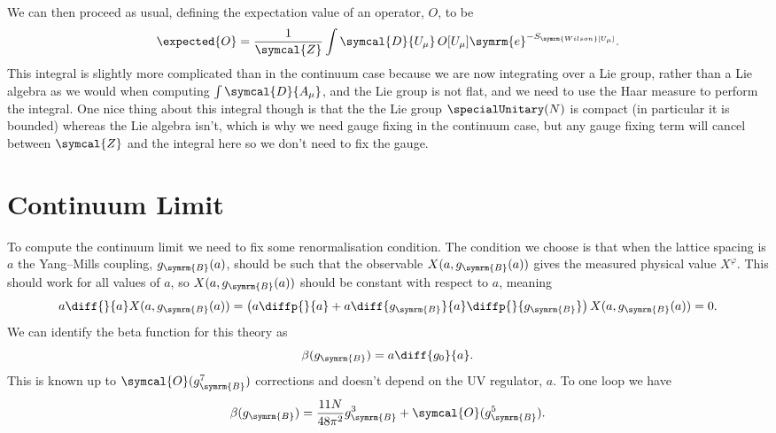 \documentclass[fleqn]{NotesClass}
\newcommand{\e}{\symrm{e}}
\newcommand{\DL}[1]{\symcal{D}{#1}}
\newcommand{\bare}{\symrm{B}}
\newcommand{\order}{\symcal{O}}
\newcommand{\partitionFunction}{\symcal{Z}}
\begin{document}
    We can then proceed as usual, defining the expectation value of an operator, \(O\), to be
    \begin{equation}
        \expected{O} = \frac{1}{\partitionFunction} \int \DL{U_\mu} \, O[U_\mu] \e^{-S_{\symrm{Wilson}[U_\mu]}}.
    \end{equation}
    This integral is slightly more complicated than in the continuum case because we are now integrating over a Lie group, rather than a Lie algebra as we would when computing \(\int\DL{A_\mu}\), and the Lie group is not flat, and we need to use the Haar measure to perform the integral.
    One nice thing about this integral though is that the the Lie group \(\specialUnitary(N)\) is compact (in particular it is bounded) whereas the Lie algebra isn't, which is why we need gauge fixing in the continuum case, but any gauge fixing term will cancel between \(\partitionFunction\) and the integral here so we don't need to fix the gauge.
    
    \section{Continuum Limit}
    To compute the continuum limit we need to fix some renormalisation condition.
    The condition we choose is that when the lattice spacing is \(a\) the Yang--Mills coupling, \(g_\bare(a)\), should be such that the observable \(X(a, g_\bare(a))\) gives the measured physical value \(X^\varphi\).
    This should work for all values of \(a\), so \(X(a, g_\bare(a))\) should be constant with respect to \(a\), meaning
    \begin{equation}
        a\diff{}{a}X(a, g_\bare(a)) = \left( a \diffp{}{a} + a\diff{g_{\bare}}{a}\diffp{}{g_\bare} \right) X(a, g_\bare(a)) = 0.
    \end{equation}
    We can identify the beta function for this theory as
    \begin{equation}
        \beta(g_\bare) = a \diff{g_0}{a}.
    \end{equation}
    This is known up to \(\order(g_\bare^7)\) corrections and doesn't depend on the UV regulator, \(a\).
    To one loop we have
    \begin{equation}
        \beta(g_\bare) = \frac{11N}{48\pi^2} g_\bare^3 + \order(g_\bare^5).
    \end{equation}
    
\end{document}
